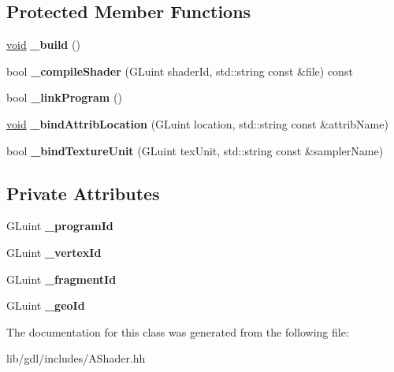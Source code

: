 \subsection*{Protected Member Functions}
\begin{DoxyCompactItemize}
\item 
\hypertarget{classgdl_1_1_a_shader_ad0608747a9ef46c049e4bd8960e721d1}{}\hyperlink{_s_d_l__audio_8h_a52835ae37c4bb905b903cbaf5d04b05f}{void} {\bfseries \+\_\+build} ()\label{classgdl_1_1_a_shader_ad0608747a9ef46c049e4bd8960e721d1}

\item 
\hypertarget{classgdl_1_1_a_shader_aeaeb664dec19e428a6e72933e1fc843b}{}bool {\bfseries \+\_\+compile\+Shader} (G\+Luint shader\+Id, std\+::string const \&file) const \label{classgdl_1_1_a_shader_aeaeb664dec19e428a6e72933e1fc843b}

\item 
\hypertarget{classgdl_1_1_a_shader_a791f52f022f2191578b72e3935fb6672}{}bool {\bfseries \+\_\+link\+Program} ()\label{classgdl_1_1_a_shader_a791f52f022f2191578b72e3935fb6672}

\item 
\hypertarget{classgdl_1_1_a_shader_a03c085f34360c4c9e2d5479f88a69916}{}\hyperlink{_s_d_l__audio_8h_a52835ae37c4bb905b903cbaf5d04b05f}{void} {\bfseries \+\_\+bind\+Attrib\+Location} (G\+Luint location, std\+::string const \&attrib\+Name)\label{classgdl_1_1_a_shader_a03c085f34360c4c9e2d5479f88a69916}

\item 
\hypertarget{classgdl_1_1_a_shader_ad77b6e2c8e74f736bccb2555f35c6fac}{}bool {\bfseries \+\_\+bind\+Texture\+Unit} (G\+Luint tex\+Unit, std\+::string const \&sampler\+Name)\label{classgdl_1_1_a_shader_ad77b6e2c8e74f736bccb2555f35c6fac}

\end{DoxyCompactItemize}
\subsection*{Private Attributes}
\begin{DoxyCompactItemize}
\item 
\hypertarget{classgdl_1_1_a_shader_a96f7f6d101ce0ac19501950314d0aded}{}G\+Luint {\bfseries \+\_\+program\+Id}\label{classgdl_1_1_a_shader_a96f7f6d101ce0ac19501950314d0aded}

\item 
\hypertarget{classgdl_1_1_a_shader_a40c8e692a66cb2c7763b1c2f09959764}{}G\+Luint {\bfseries \+\_\+vertex\+Id}\label{classgdl_1_1_a_shader_a40c8e692a66cb2c7763b1c2f09959764}

\item 
\hypertarget{classgdl_1_1_a_shader_a6c09382222fb0a167b43859ec22d8ef9}{}G\+Luint {\bfseries \+\_\+fragment\+Id}\label{classgdl_1_1_a_shader_a6c09382222fb0a167b43859ec22d8ef9}

\item 
\hypertarget{classgdl_1_1_a_shader_ac27a24a46b625af8dd90196a6379e40f}{}G\+Luint {\bfseries \+\_\+geo\+Id}\label{classgdl_1_1_a_shader_ac27a24a46b625af8dd90196a6379e40f}

\end{DoxyCompactItemize}


The documentation for this class was generated from the following file\+:\begin{DoxyCompactItemize}
\item 
lib/gdl/includes/A\+Shader.\+hh\end{DoxyCompactItemize}
